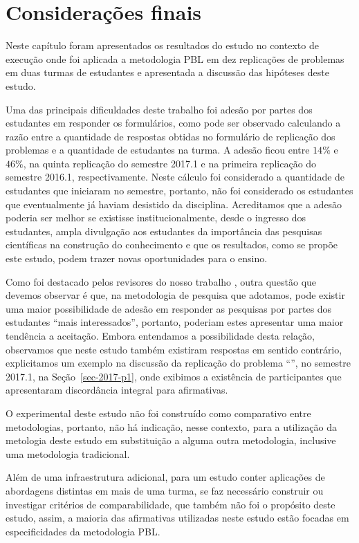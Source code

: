 \section{Considerações finais}
\label{sec-consideracoes-resultados}
Neste capítulo foram apresentados os resultados do estudo no contexto de execução onde foi aplicada a
metodologia \ac{PBL} em dez replicações de problemas em duas turmas de estudantes e apresentada a discussão
das hipóteses deste estudo.

Uma das principais dificuldades deste trabalho foi adesão
por partes dos estudantes em responder os formulários,
como pode ser observado calculando a razão entre
a quantidade de respostas obtidas no formulário de
replicação dos problemas e a quantidade de estudantes
na turma.
A adesão ficou entre $14\%$ e $46\%$, na
quinta replicação do semestre 2017.1 e na primeira
replicação do semestre 2016.1, respectivamente.
Neste cálculo foi considerado a quantidade de estudantes
que iniciaram no semestre, portanto, não foi considerado os
estudantes que eventualmente já haviam desistido
da disciplina.
Acreditamos que a adesão poderia ser melhor se existisse
institucionalmente, desde o ingresso dos estudantes,
ampla divulgação aos estudantes da importância das pesquisas
científicas na construção do conhecimento e que os resultados,
como se propõe este estudo, podem trazer novas oportunidades
para o ensino.

Como foi destacado pelos revisores do nosso trabalho \cite{gavaza2017},
outra questão que devemos observar é que, na metodologia de pesquisa
que adotamos, pode existir uma maior possibilidade
de adesão em responder as pesquisas por partes
dos estudantes ``mais interessados'', portanto, poderiam
estes apresentar uma maior tendência a aceitação.
Embora entendamos a possibilidade desta relação, observamos que
neste estudo também existiram respostas em sentido
contrário, explicitamos um exemplo na discussão da
replicação do problema ``\ProblemaG'', no semestre 2017.1,
na Seção~\ref{sec-2017-p1}, onde exibimos a existência
de participantes que apresentaram discordância integral
para afirmativas.

O experimental deste estudo não foi construído como comparativo
entre metodologias, portanto, não há indicação, nesse
contexto, para a utilização da metologia deste estudo
em substituição a alguma outra metodologia, inclusive uma
metodologia tradicional.

Além de uma infraestrutura adicional, para um estudo conter
aplicações de abordagens distintas em mais de uma turma,
se faz necessário construir ou investigar critérios de
comparabilidade, que também não foi o propósito deste estudo,
assim, a maioria das afirmativas utilizadas neste estudo
estão focadas em especificidades da metodologia \ac{PBL}.

